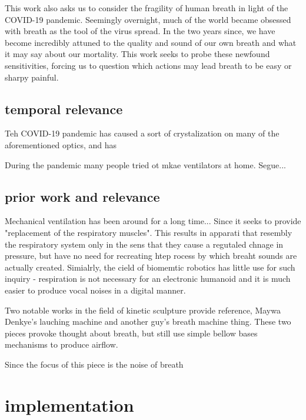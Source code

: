 \documentclass[letterpaper]{article}
\begin{document}
This work also asks us to consider the fragility of human breath in light of the COVID-19 pandemic. Seemingly overnight, much of the world became obsessed with breath as the tool of the virus spread. In the two years since, we have become incredibly attuned to the quality and sound of our own breath and what it may say about our mortality. This work seeks to probe these newfound sensitivities, forcing us to question which actions may lead breath to be easy or sharpy painful. 




\subsection{temporal relevance}
Teh COVID-19 pandemic has caused a sort of crystalization on many of the aforementioned optics, and has  

During the pandemic many people tried ot mkae ventilators at home. Segue...

\subsection{prior work and relevance}
Mechanical ventilation has been around for a long time... Since it  seeks to provide "replacement of the respiratory muscles". \cite{ventilatorhistory} This results in apparati that resembly the respiratory system only in the sens that they cause a regutaled chnage in pressure, but have no need for recreating htep rocess by which breaht sounds are actually created. Simialrly, the cield of biomemtic robotics has little use for such inquiry - respiration is not necessary for an electronic humanoid and it is much easier to produce vocal noises in a digital manner. 

Two notable works in the field of kinetic sculpture provide reference, Maywa Denkye's lauching machine and another guy's breath machine thing. These two pieces provoke thought about breath, but still use simple bellow bases mechanisms to produce airflow. %

Since the focus of this piece is the noise of breath 



\section{implementation}
\end{document}
